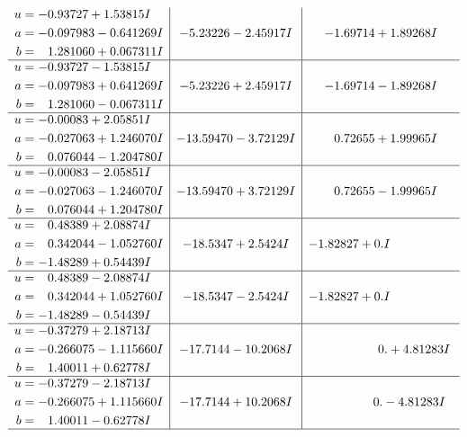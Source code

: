 \documentclass[1p]{elsarticle_modified}
\theoremstyle{definition}
\begin{document}
$$\begin{array}{c|c|c}
\begin{aligned}
u &= -0.93727 + 1.53815 I \\
a &= -0.097983 - 0.641269 I \\
b &= \phantom{-}1.281060 + 0.067311 I\end{aligned}
 & -5.23226 - 2.45917 I & -1.69714 + 1.89268 I \\ \hline\begin{aligned}
u &= -0.93727 - 1.53815 I \\
a &= -0.097983 + 0.641269 I \\
b &= \phantom{-}1.281060 - 0.067311 I\end{aligned}
 & -5.23226 + 2.45917 I & -1.69714 - 1.89268 I \\ \hline\begin{aligned}
u &= -0.00083 + 2.05851 I \\
a &= -0.027063 + 1.246070 I \\
b &= \phantom{-}0.076044 - 1.204780 I\end{aligned}
 & -13.59470 - 3.72129 I & \phantom{-}0.72655 + 1.99965 I \\ \hline\begin{aligned}
u &= -0.00083 - 2.05851 I \\
a &= -0.027063 - 1.246070 I \\
b &= \phantom{-}0.076044 + 1.204780 I\end{aligned}
 & -13.59470 + 3.72129 I & \phantom{-}0.72655 - 1.99965 I \\ \hline\begin{aligned}
u &= \phantom{-}0.48389 + 2.08874 I \\
a &= \phantom{-}0.342044 - 1.052760 I \\
b &= -1.48289 + 0.54439 I\end{aligned}
 & -18.5347 + 2.5424 I & -1.82827 + 0. I\phantom{ +0.000000I} \\ \hline\begin{aligned}
u &= \phantom{-}0.48389 - 2.08874 I \\
a &= \phantom{-}0.342044 + 1.052760 I \\
b &= -1.48289 - 0.54439 I\end{aligned}
 & -18.5347 - 2.5424 I & -1.82827 + 0. I\phantom{ +0.000000I} \\ \hline\begin{aligned}
u &= -0.37279 + 2.18713 I \\
a &= -0.266075 - 1.115660 I \\
b &= \phantom{-}1.40011 + 0.62778 I\end{aligned}
 & -17.7144 - 10.2068 I & \phantom{-0.000000 -}0. + 4.81283 I \\ \hline\begin{aligned}
u &= -0.37279 - 2.18713 I \\
a &= -0.266075 + 1.115660 I \\
b &= \phantom{-}1.40011 - 0.62778 I\end{aligned}
 & -17.7144 + 10.2068 I & \phantom{-0.000000 } 0. - 4.81283 I\\
 \hline 
 \end{array}$$\newpage\newpage\renewcommand{\arraystretch}{1}
\end{document}
